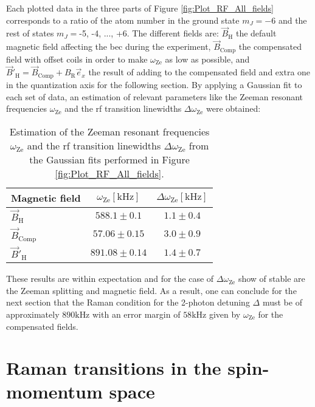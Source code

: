 \pagebreak

Each plotted data in the three parts of Figure \ref{fig:Plot_RF_All_fields} corresponds to a ratio of the atom number in the ground state $m_J = -6$ and the rest of states $m_J = $-5, -4, ..., +6. The different fields are: $\vec{B}_\text{H}$ the default magnetic field affecting the \ac{bec} during the experiment, $\vec{B}_\text{Comp}$ the compensated field with offset coils in order to make $\omega_\text{Ze}$ as low as possible, and $\vec{B}'_\text{H} = \vec{B}_\text{Comp} +B_\text{R}\vec{e}_x$ the result of adding to the compensated field and extra one in the quantization axis for the following section. By applying a Gaussian fit to each set of data, an estimation of relevant parameters like the Zeeman resonant frequencies $\omega_\text{Ze}$ and the \ac{rf} transition linewidths $\Delta \omega_\text{Ze}$ were obtained:

\begin{table}[htbp] \centering
	\begin{tabular}{@{}l|c|c@{}}\hline
	Magnetic field	                  & $\omega_\text{Ze} [\si{\kilo\hertz}]$           & $\Delta \omega_\text{Ze} [\si{\kilo\hertz}]$ \\ \hline\hline
	$\vec{B}_\text{H}$	     &  $588.1 \pm 0.1 $   & $1.1 \pm 0.4 $        \\
	$\vec{B}_\text{Comp}$	 &  $57.06 \pm 0.15 $  & $3.0 \pm 0.9 $        \\ 
	$\vec{B}'_\text{H}$	     &  $891.08 \pm 0.14 $ & $1.4 \pm 0.7 $       \\\hline
	\end{tabular}
	\caption[Estimation of the Zeeman resonant frequencies $\omega_\text{Ze}$ and the \ac{rf} transition linewidths $\Delta \omega_\text{Ze}$]{Estimation of the Zeeman resonant frequencies $\omega_\text{Ze}$ and the \ac{rf} transition linewidths $\Delta \omega_\text{Ze}$ from the Gaussian fits performed in Figure \ref{fig:Plot_RF_All_fields}.}
	\label{tab:results_Plot_RF_All_fields}
\end{table}

These results are within expectation and for the case of $\Delta \omega_\text{Ze}$ show of stable are the Zeeman splitting and magnetic field. As a result, one can conclude for the next section that the Raman condition for the 2-photon detuning $\Delta$ must be of approximately $890\si{\kilo\hertz}$ with an error margin of $58\si{\kilo\hertz}$ given by $\omega_\text{Ze}$ for the compensated fields.

\section{Raman transitions in the spin-momentum space}

